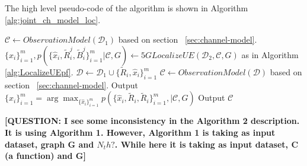 \documentclass[conference, 10pt]{IEEEtran}
\begin{document}
The high level pseudo-code of the algorithm is shown in Algorithm \ref{alg:joint_ch_model_loc}.  


\begin{algorithm}
\caption{$JOML(\mathcal{D}_1, \mathcal{D}_2, G, N_{em})$}
\label{alg:joint_ch_model_loc}
\begin{algorithmic}[1]
\State $\mathcal{C} \gets Observation Model(\mathcal{D}_1)$ based on section ~\ref{sec:channel-model}.
	\State $\{\hat{x}_i\}_{i=1}^m, p(\{\hat{x}_i,\tilde{R}^j_i,\tilde{B}^j_i\}_{i=1}^m|\mathcal{C},G) \gets 5GLocalizeUE(\mathcal{D}_2,\mathcal{C},G)$ as in Algorithm \ref{alg:LocalizeUEpf}. \label{step:localize}
	\State $\mathcal{D} \gets \mathcal{D}_1 \cup \{\tilde{R}_i,\hat{x}_i\}_{i=1}^m$ \label{line:em_approx}
	\State $\mathcal{C} \gets Observation Model(\mathcal{D})$ based on section ~\ref{sec:channel-model}.
\EndFor
\State Output $\{\hat{x}_i\}_{i=1}^m = \arg \max_{\{\hat{x}_i\}_{i=1}^m} p(\{\hat{x}_i,\tilde{R}_i, \tilde{R}_i\}_{i=1}^m,|\mathcal{C},G)$
\State Output $\mathcal{C}$
\end{algorithmic}
\end{algorithm}  

 \textbf{[QUESTION: I see some inconsistency in the Algorithm 2 description. It is using Algorithm 1. However, Algorithm 1 is taking as input dataset, graph G and ${N_th}?$. While here it is taking as input dataset, C (a function) and G]} 
\end{document}
